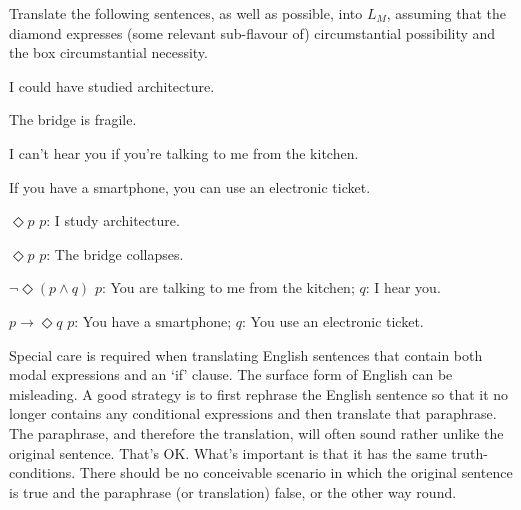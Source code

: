 \begin{exercise}
  Translate the following sentences, as well as possible, into $L_{M}$, assuming
  that the diamond expresses (some relevant sub-flavour of) circumstantial
  possibility and the box circumstantial necessity.
  \begin{exlist}
  \item I could have studied architecture.
  \item The bridge is fragile.
  \item I can't hear you if you're talking to me from the kitchen. 
  \item If you have a smartphone, you can use an electronic ticket.
    
  \end{exlist} 
\end{exercise}
\begin{solution}
  \begin{sollist}
    \item $\Diamond p$ \quad  $p$: I study architecture.
    \item $\Diamond p$ \quad  $p$: The bridge collapses.
    \item $\neg\Diamond(p \land q)$ \quad  $p$: You are talking to me from the kitchen; $q$: I hear you.
    \item $p \to \Diamond q$ \quad $p$: You have a smartphone; $q$: You use an electronic ticket.
  \end{sollist}
\end{solution}

Special care is required when translating English sentences that contain both
modal expressions and an `if' clause. The surface form of English can be
misleading. A good strategy is to first rephrase the English sentence so that it
no longer contains any conditional expressions and then translate that
paraphrase. The paraphrase, and therefore the translation, will often sound
rather unlike the original sentence. That's OK. What's important is that it has
the same truth-conditions. There should be no conceivable scenario in which the
original sentence is true and the paraphrase (or translation) false, or the
other way round.


